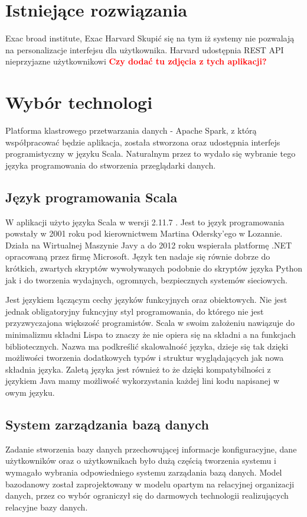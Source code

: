 \documentclass[a4paper,12pt,twoside]{article}
\begin{document}
\newpage
\section{Istniejące rozwiązania}  

Exac broad institute, Exac Harvard  
Skupić się na tym iż systemy nie pozwalają na personalizacje interfejsu dla użytkownika.
Harvard udostępnia REST API nieprzyjazne użytkownikowi \newline
\textcolor{red}{\textbf{Czy dodać tu zdjęcia z tych aplikacji?}}

\newpage
\section{Wybór technologi}

Platforma klastrowego przetwarzania danych - Apache Spark\cite{spark}, z którą współpracować będzie aplikacja, została stworzona oraz udostępnia interfejs programistyczny w języku Scala.
Naturalnym przez to wydało się wybranie tego języka programowania do stworzenia przeglądarki danych.

  
\subsection{Język programowania Scala}
W aplikacji użyto języka Scala w wersji 2.11.7 \cite{jezykScala}. Jest to język programowania powstały w 2001 roku pod kierownictwem Martina Odersky'ego w Lozannie.
Działa na Wirtualnej Maszynie Javy a do 2012 roku wspierała platformę .NET opracowaną przez firmę Microsoft. Język ten nadaje się równie dobrze do krótkich, zwartych skryptów  wywoływanych podobnie do skryptów języka Python jak i do tworzenia wydajnych, ogromnych, bezpiecznych systemów sieciowych.

Jest językiem łączącym cechy języków funkcyjnych oraz obiektowych. 
Nie jest jednak obligatoryjny fukncyjny styl programowania, do którego nie jest przyzwyczajona większość programistów.
 Scala w swoim założeniu nawiązuje do minimalizmu składni Lispa to znaczy że nie opiera się na składni a na funkcjach bibliotecznych. Nazwa ma podkreślić skalowalność języka, dzieje się tak dzięki możliwości tworzenia dodatkowych typów i struktur wyglądających jak nowa składnia języka.
Zaletą języka jest również to że dzięki kompatybilności z językiem Java mamy możliwość wykorzystania każdej lini kodu napisanej w owym języku.

\subsection{System zarządzania bazą danych}  
Zadanie stworzenia bazy danych przechowującej informacje konfiguracyjne, dane użytkowników oraz o użytkownikach było 
dużą częścią tworzenia systemu i
wymagało wybrania odpowiedniego systemu zarządania bazą danych.
Model bazodanowy został zaprojektowany w modelu opartym na relacyjnej organizacji danych, przez co wybór ograniczył się do
darmowych technologii realizujących relacyjne bazy danych.
\end{document}
